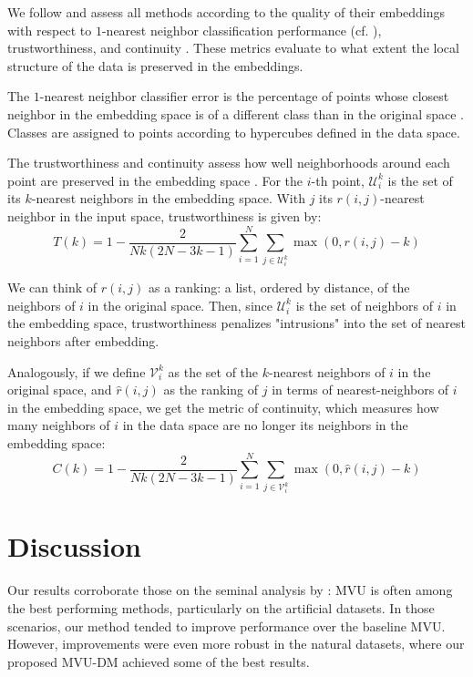 \documentclass{article} %
\begin{document}
We follow \citet{dr-review} and assess all methods according to the quality of their embeddings with respect to $1$-nearest neighbor classification performance (cf. \citet{1-nn}), trustworthiness, and continuity \citep{t&c}. These metrics evaluate to what extent the local structure of the data is preserved in the embeddings.

The $1$-nearest neighbor classifier error is the percentage of points whose closest neighbor in the embedding space is of a different class than in the original space \citep{1-nn}. Classes are assigned to points according to hypercubes defined in the data space.

The trustworthiness and continuity assess how well neighborhoods around each point are preserved in the embedding space \citep{t&c}. For the $i$-th point, $\mathcal{U}_i^k$ is the set of its $k$-nearest neighbors in the embedding space. With $j$ its $r(i,j)$-nearest neighbor in the input space, trustworthiness is given by:
\begin{equation}
T(k)=1- \frac{2}{Nk(2N-3k-1)}\sum_{i=1}^{N}\sum_{j\in\mathcal{U}_{i}^{k}} \max(0,r(i,j)-k)
\end{equation}

We can think of $r(i,j)$ as a ranking: a list, ordered by distance, of the neighbors of $i$ in the original space. Then, since $\mathcal{U}_i^k$ is the set of neighbors of $i$ in the embedding space, trustworthiness penalizes "intrusions" into the set of nearest neighbors after embedding.

Analogously, if we define $\mathcal{V}_i^k$ as the set of the $k$-nearest neighbors of $i$ in the original space, and $\hat{r}(i,j)$ as the ranking of $j$ in terms of nearest-neighbors of $i$ in the embedding space, we get the metric of continuity, which measures how many neighbors of $i$ in the data space are no longer its neighbors in the embedding space:
\begin{equation}
C(k)=1- \frac{2}{Nk(2N-3k-1)}\sum_{i=1}^{N}\sum_{j\in\mathcal{V}_{i}^{k}} \max(0,\hat{r}(i,j)-k)
\end{equation}

\section{Discussion} \label{sec:results}

Our results corroborate those on the seminal analysis by \citet{dr-review}: MVU is often among the best performing methods, particularly on the artificial datasets. In those scenarios, our method tended to improve performance over the baseline MVU. However, improvements were even more robust in the natural datasets, where our proposed MVU-DM achieved some of the best results.
\end{document}
